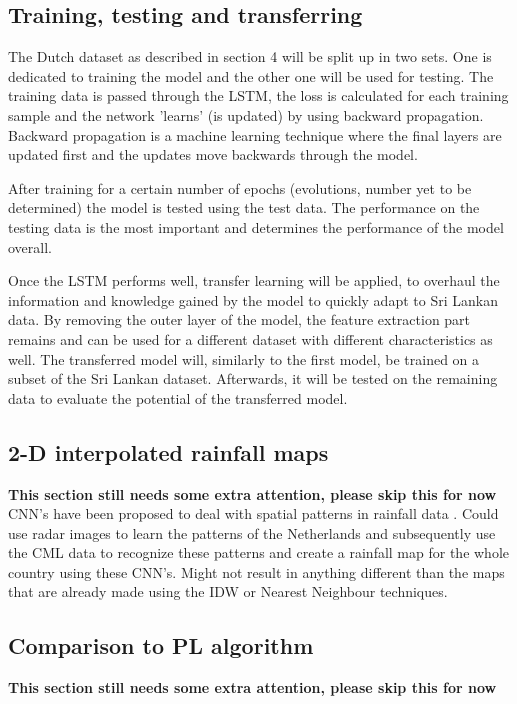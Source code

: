 \documentclass[twocolumn, 10pt, a4paper]{article}
\begin{document}
	\subsection{Training, testing and transferring}
	The  Dutch dataset as described in section 4 will be split up in two sets. One is dedicated to training the model and the other one will be used for testing. The training data is passed through the LSTM, the loss is calculated for each training sample and the network 'learns' (is updated) by using backward propagation. Backward propagation is a machine learning technique where the final layers are updated first and the updates move backwards through the model. 
	
	After training for a certain number of epochs (evolutions, number yet to be determined) the model is tested using the test data. The performance on the testing data is the most important and determines the performance of the model overall. 
	
	Once the LSTM performs well, transfer learning will be applied, to overhaul the information and knowledge gained by the model to quickly adapt to Sri Lankan data. By removing the outer layer of the model, the feature extraction part remains and can be used for a different dataset with different characteristics as well. The transferred model will, similarly to the first model, be trained on a subset of the Sri Lankan dataset. Afterwards, it will be tested on the remaining data to evaluate the potential of the transferred model. 
	
	\subsection{2-D interpolated rainfall maps}
	\textbf{This section still needs some extra attention, please skip this for now}
	CNN's have been proposed to deal with spatial patterns in rainfall data \cite{Sadeghi2019}. Could use radar images to learn the patterns of the Netherlands and subsequently use the CML data to recognize these patterns and create a rainfall map for the whole country using these CNN's. Might not result in anything different than the maps that are already made using the IDW or Nearest Neighbour techniques. 
	
	\subsection{Comparison to PL algorithm}
	\textbf{This section still needs some extra attention, please skip this for now}	
	
\end{document}
